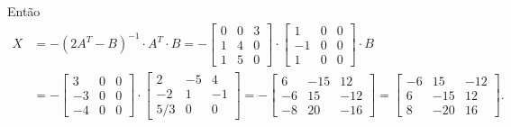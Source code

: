 \documentclass[12pt,a4paper]{article}
\begin{document}
\begin{ExerciseList}
\begin{enumerate}
Então
\begin{align*}
X
& = - (2 A^T - B)^{-1} \cdot A^T \cdot B
= - \begin{bmatrix}
0 & 0 & 3 \\
1 & 4 & 0 \\
1 & 5 & 0
\end{bmatrix}
\cdot
\begin{bmatrix}
 1 & 0 & 0 \\
-1 & 0 & 0 \\
 1 & 0 & 0
\end{bmatrix}
\cdot B \\
& =
-
\begin{bmatrix}
 3 & 0 & 0 \\
-3 & 0 & 0 \\
-4 & 0 & 0
\end{bmatrix}
\cdot
\begin{bmatrix}
  2 & -5 &  4 \\
 -2 &  1 & -1 \\
5/3 &  0 &  0
\end{bmatrix}
=
-
\begin{bmatrix}
 6 & -15 &  12 \\
-6 &  15 & -12 \\
-8 &  20 & -16
\end{bmatrix}
=
\begin{bmatrix}
-6 &  15 & -12 \\
 6 & -15 &  12 \\
 8 & -20 &  16
\end{bmatrix}.
\end{align*}
\end{enumerate}


\end{ExerciseList}
\end{document}
